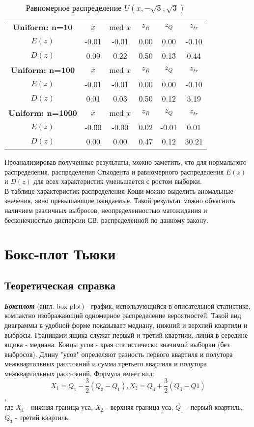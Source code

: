 \documentclass[14pt]{extarticle}
\begin{document}
\begin{table}[htbp]
    \centering
    \begin{tabular}{|c|c|c|c|c|c|}
        \toprule
        \textbf{Uniform: n=10} & \(\overline{x}\) & med \(x\) & \(z_R\) & \(z_Q\) & \(z_{tr}\)\\
        \(E(z)\) & -0.01 & -0.01 & 0.00 & 0.00 & -0.10   \\
        \(D(z)\) & 0.09 & 0.22 & 0.50 & 0.13 & 0.44 \\
        \midrule
  	\textbf{Uniform: n=100} & \(\overline{x}\) & med \(x\) & \(z_R\) & \(z_Q\) & \(z_{tr}\)\\
        \(E(z)\) & -0.01 & -0.01 & 0.00 & 0.00 & -0.10  \\
        \(D(z)\) & 0.01 & 0.03 & 0.50 & 0.12 & 3.19 \\
        \midrule
	\textbf{Uniform: n=1000} & \(\overline{x}\)& med \(x\) & \(z_R\) & \(z_Q\) & \(z_{tr}\)\\
        \(E(z)\) & -0.00 & -0.00 & 0.02 & -0.01 & 0.01  \\
        \(D(z)\) & 0.00 & 0.00 & 0.47 & 0.12 & 30.21 \\
        \toprule
    \end{tabular}
    \caption{Равномерное распределение \(U(x, -\sqrt{3}, \sqrt{3})\)}
    \label{tab:uniform_t}
\end{table}        

Проанализировав полученные результаты, можно заметить, что для нормального распределения, распределения Стьюдента и равномерного распределения \(E(z)\) и \(D(z)\) для всех характеристик уменьшается с ростом выборки.\\
В таблице характеристик распределения Коши можно выделить аномальные значения, явно превышающие ожидаемые. Такой результат можно объяснить наличием различных выбросов, неопределенностью матожидания и бесконечностью дисперсии СВ, распределенной по данному закону.

\section{Бокс-плот Тьюки}

\subsection{Теоретическая справка}

\textbf{\textit{Боксплот}} (англ. box plot) - график, использующийся в описательной статистике, компактно изображающий одномерное распределение вероятностей. Такой вид диаграммы в удобной форме показывает медиану, нижний и верхний квартили и выбросы. Границами ящика служат первый и третий квартили, линия в середине ящика - медиана. Концы усов - края статистически значимой выборки (без выбросов). Длину "усов" определяют разность первого квартиля и полутора межквартильных расстояний и сумма третьего квартиля и полутора межквартильных расстояний. Формула имеет вид:
\[X_1 = Q_1-\frac{3}{2}(Q_3-Q_1), X_2=Q_3+\frac{3}{2}(Q_3-Q1)\], \\
где \(X_1\) - нижняя граница уса, \(X_2\) - верхняя граница уса, \(Q_1\) - первый квартиль, \(Q_3\) - третий квартиль.
\end{document}
